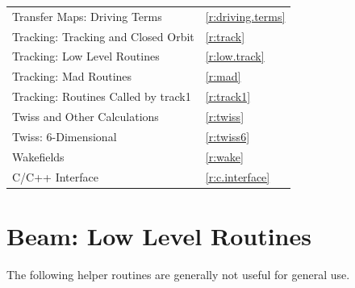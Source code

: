 \begin{center}
\begin{tabular}{ll}
  Transfer Maps: Driving Terms                & \ref{r:driving.terms}  \\
  Tracking: Tracking and Closed Orbit         & \ref{r:track}          \\
  Tracking: Low Level Routines                & \ref{r:low.track}      \\
  Tracking: Mad Routines                      & \ref{r:mad}            \\
  Tracking: Routines Called by track1         & \ref{r:track1}         \\
  Twiss and Other Calculations                & \ref{r:twiss}          \\
  Twiss: 6-Dimensional                        & \ref{r:twiss6}         \\
  Wakefields                                  & \ref{r:wake}           \\
  C/C++ Interface                             & \ref{r:c.interface}    \\
\end{tabular}
\end{center}
\toffset

\section{Beam: Low Level Routines}
\label{r:low.beam}

The following helper routines are generally not useful for general use.

